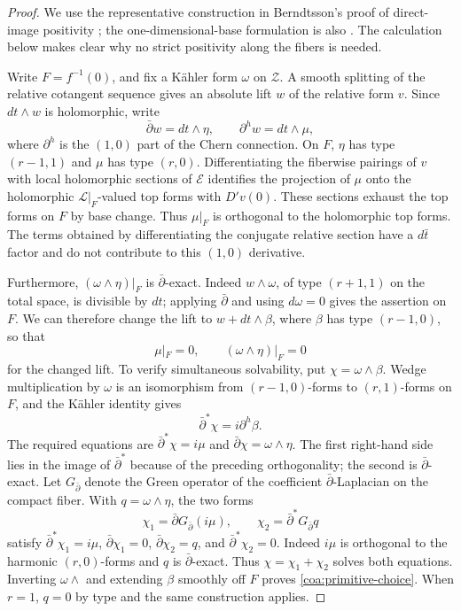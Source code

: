 \begin{proof}
We use the representative construction in Berndtsson's proof of direct-image
positivity \cite[Proposition~4.2 and formula~(4.8)]{Berndtsson2009}; the
one-dimensional-base formulation is also
\cite[formula~(2.1) and Lemma~2.1]{Berndtsson2011}.  The calculation below
makes clear why no strict positivity along the fibers is needed.

Write $F=f^{-1}(0)$, and fix a K\"ahler form $\omega$ on $\mathcal Z$.
A smooth splitting of the relative cotangent sequence gives an absolute
lift $w$ of the relative form $v$.  Since $dt\wedge w$ is holomorphic, write
\[
 \bar\partial w=dt\wedge\eta,
 \qquad \partial^h w=dt\wedge\mu,
\]
where $\partial^h$ is the $(1,0)$ part of the Chern connection.  On $F$,
$\eta$ has type $(r-1,1)$ and $\mu$ has type $(r,0)$.
Differentiating the fiberwise pairings of $v$ with local holomorphic
sections of $\mathcal E$ identifies the projection of $\mu$ onto the
holomorphic $\mathcal L|_F$-valued top forms with $D'v(0)$.  These sections
exhaust the top forms on $F$ by base change.  Thus $\mu|_F$ is orthogonal
to the holomorphic top forms.  The terms obtained by differentiating the
conjugate relative section have a $d\bar t$ factor and do not contribute
to this $(1,0)$ derivative.

Furthermore, $(\omega\wedge\eta)|_F$ is $\bar\partial$-exact.  Indeed
$w\wedge\omega$, of type $(r+1,1)$ on the total space, is divisible by
$dt$; applying $\bar\partial$ and using $d\omega=0$ gives the assertion
on $F$.  We can therefore change the lift to $w+dt\wedge\beta$, where
$\beta$ has type $(r-1,0)$, so that
\begin{equation}\label{coa:primitive-choice}
 \mu|_F=0,\qquad (\omega\wedge\eta)|_F=0
\end{equation}
for the changed lift.  To verify simultaneous solvability, put
$\chi=\omega\wedge\beta$.  Wedge multiplication by $\omega$ is an
isomorphism from $(r-1,0)$-forms to $(r,1)$-forms on $F$, and the
K\"ahler identity gives
\[
 \bar\partial^*\chi=i\partial^h\beta.
\]
The required equations are
$\bar\partial^*\chi=i\mu$ and
$\bar\partial\chi=\omega\wedge\eta$.
The first right-hand side lies in the image of $\bar\partial^*$ because
of the preceding orthogonality; the second is $\bar\partial$-exact.
Let $G_{\bar\partial}$ denote the Green operator of the coefficient
$\bar\partial$-Laplacian on the compact fiber.  With
$q=\omega\wedge\eta$, the two forms
\[
 \chi_1=\bar\partial G_{\bar\partial}(i\mu),\qquad
 \chi_2=\bar\partial^*G_{\bar\partial}q
\]
satisfy
$\bar\partial^*\chi_1=i\mu$, $\bar\partial\chi_1=0$,
$\bar\partial\chi_2=q$, and $\bar\partial^*\chi_2=0$.
Indeed $i\mu$ is orthogonal to the harmonic $(r,0)$-forms and $q$ is
$\bar\partial$-exact.  Thus $\chi=\chi_1+\chi_2$ solves both equations.
Inverting $\omega\wedge$ and extending $\beta$ smoothly off $F$ proves
\eqref{coa:primitive-choice}.  When $r=1$, $q=0$ by type and the same
construction applies.


\end{proof}
